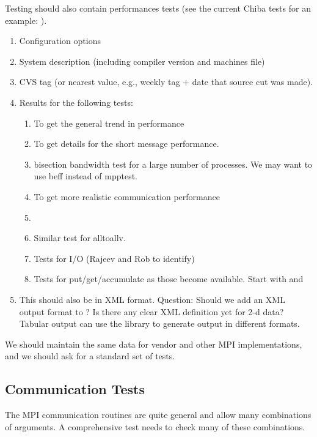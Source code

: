 \documentclass{article}
\begin{document}
Testing should also contain performances tests (see the current Chiba
tests for an example: ).
\begin{enumerate}
\item Configuration options
\item System description (including compiler version and machines file)
\item CVS tag (or nearest value, e.g., weekly tag + date that source
cut was made).
\item Results for the following tests:
    \begin{enumerate}
    \item {} To get the general trend in performance
    \item {} To get details for the short message
performance. 
    \item bisection bandwidth test for a large number of processes.
    We may want to use beff instead of mpptest.
    \item {} To get more
    realistic communication performance
    \item {} 
    \item Similar test for alltoallv. 
    \item Tests for I/O (Rajeev and Rob to identify)
    \item Tests for put/get/accumulate as those become available.
    Start with  and 
    \end{enumerate}
\item This should also be in XML format.
    Question: Should we add an XML output format to ?
Is there any clear XML definition yet for 2-d data?
Tabular output can use the  library to generate output in
different formats.


\end{enumerate}
We should maintain the same data for vendor and other MPI
implementations, and we should ask for a standard set of tests.  

\subsection{Communication Tests}
\label{sec:testing-comm}

The MPI communication routines are quite general and allow many
combinations of arguments.  A comprehensive test needs to check many
of these combinations.  
\end{document}
